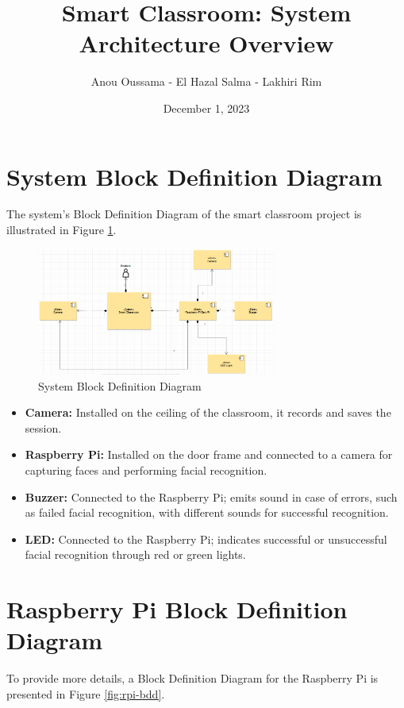 \documentclass[11pt]{article}
\title{\textbf{Smart Classroom: System Architecture Overview}}
\author{Anou Oussama - El Hazal Salma - Lakhiri Rim}
\date{December 1, 2023}
\begin{document}
	\maketitle
	
	\section{System Block Definition Diagram}
	The system's Block Definition Diagram of the smart classroom project is illustrated in Figure \ref{fig:system-bdd}.
	
	\begin{figure}[h]
		\centering
		\includegraphics[width=0.7\textwidth]{SC.png}
		\caption{System Block Definition Diagram}\label{fig:system-bdd}
	\end{figure}
	
	\begin{itemize}
		\item \textbf{Camera:} Installed on the ceiling of the classroom, it records and saves the session.
		\item \textbf{Raspberry Pi:} Installed on the door frame and connected to a camera for capturing faces and performing facial recognition.
		\item \textbf{Buzzer:} Connected to the Raspberry Pi; emits sound in case of errors, such as failed facial recognition, with different sounds for successful recognition.
		\item \textbf{LED:} Connected to the Raspberry Pi; indicates successful or unsuccessful facial recognition through red or green lights.
	\end{itemize}
	
	\pagebreak
	
	\section{Raspberry Pi Block Definition Diagram}
	To provide more details, a Block Definition Diagram for the Raspberry Pi is presented in Figure \ref{fig:rpi-bdd}.
	
\end{document}
